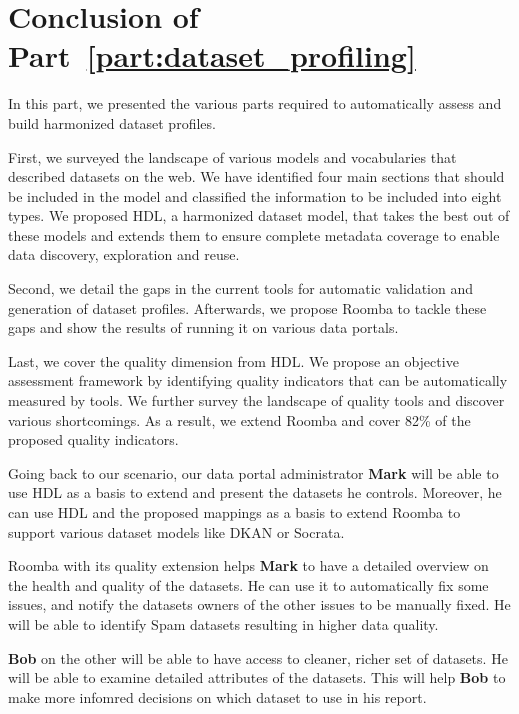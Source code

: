 \chapter*{Conclusion of Part~\ref{part:dataset_profiling}}

In this part, we presented the various parts required to automatically assess and build harmonized dataset profiles.

First, we surveyed the landscape of various models and vocabularies that described datasets on the web. We have identified four main sections that should be included in the model and classified the information to be included into eight types. We proposed HDL, a harmonized dataset model, that takes the best out of these models and extends them to ensure complete metadata coverage to enable data discovery, exploration and reuse.

Second, we detail the gaps in the current tools for automatic validation and generation of dataset profiles. Afterwards, we propose Roomba to tackle these gaps and show the results of running it on various data portals.

Last, we cover the quality dimension from HDL. We propose an objective assessment framework by identifying quality indicators that can be automatically measured by tools. We further survey the landscape of quality tools and discover various shortcomings. As a result, we extend Roomba and cover 82\% of the proposed quality indicators.

Going back to our scenario, our data portal administrator \textbf{Mark} will be able to use HDL as a basis to extend and present the datasets he controls. Moreover, he can use HDL and the proposed mappings as a basis to extend Roomba to support various dataset models like DKAN or Socrata.

Roomba with its quality extension helps \textbf{Mark} to have a detailed overview on the health and quality of the datasets. He can use it to automatically fix some issues, and notify the datasets owners of the other issues to be manually fixed. He will be able to identify Spam datasets resulting in higher data quality.

\textbf{Bob} on the other will be able to have access to cleaner, richer set of datasets. He will be able to examine detailed attributes of the datasets. This will help \textbf{Bob} to make more infomred decisions on which dataset to use in his report.




